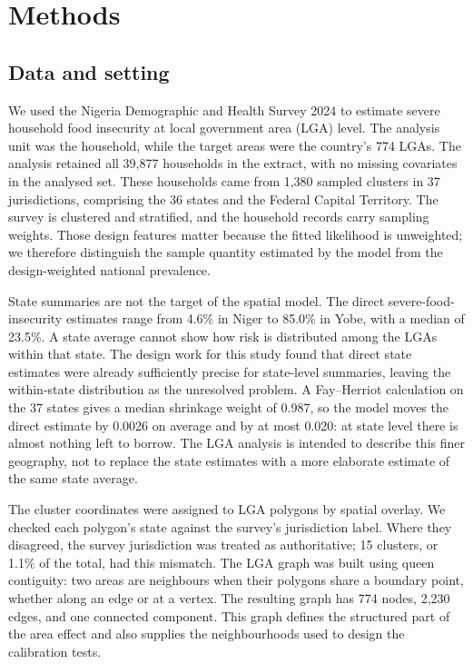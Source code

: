 \providecommand{\todo}[1]{\textbf{[TODO: #1]}}

\section{Methods}

\subsection{Data and setting}

We used the Nigeria Demographic and Health Survey 2024 to estimate severe household food insecurity at local government area (LGA) level. The analysis unit was the household, while the target areas were the country's 774 LGAs. The analysis retained all 39,877 households in the extract, with no missing covariates in the analysed set. These households came from 1,380 sampled clusters in 37 jurisdictions, comprising the 36 states and the Federal Capital Territory. The survey is clustered and stratified, and the household records carry sampling weights. Those design features matter because the fitted likelihood is unweighted; we therefore distinguish the sample quantity estimated by the model from the design-weighted national prevalence.

State summaries are not the target of the spatial model. The direct severe-food-insecurity estimates range from 4.6\% in Niger to 85.0\% in Yobe, with a median of 23.5\%. A state average cannot show how risk is distributed among the LGAs within that state. The design work for this study found that direct state estimates were already sufficiently precise for state-level summaries, leaving the within-state distribution as the unresolved problem. A Fay--Herriot calculation on the 37 states gives a median shrinkage weight of 0.987, so the model moves the direct estimate by 0.0026 on average and by at most 0.020: at state level there is almost nothing left to borrow. The LGA analysis is intended to describe this finer geography, not to replace the state estimates with a more elaborate estimate of the same state average.

The cluster coordinates were assigned to LGA polygons by spatial overlay. We checked each polygon's state against the survey's jurisdiction label. Where they disagreed, the survey jurisdiction was treated as authoritative; 15 clusters, or 1.1\% of the total, had this mismatch. The LGA graph was built using queen contiguity: two areas are neighbours when their polygons share a boundary point, whether along an edge or at a vertex. The resulting graph has 774 nodes, 2,230 edges, and one connected component. This graph defines the structured part of the area effect and also supplies the neighbourhoods used to design the calibration tests.

